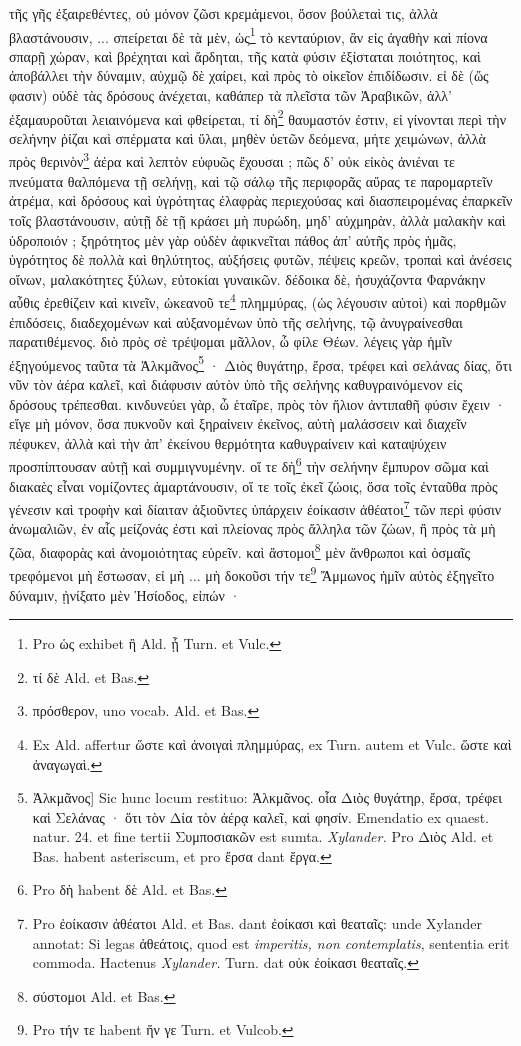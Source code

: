 \documentclass[a4paper, 11pt, oneside, polutonikogreek, german]{article}
\begin{document}
τῆς γῆς ἐξαιρεθέντες, οὐ μόνον ζῶσι κρεμάμενοι, ὅσον βούλεταὶ τις, ἀλλὰ βλαστάνουσιν, ... σπείρεται δὲ τὰ μὲν, ὡς\footnote{Pro ὡς exhibet ἢ Ald. ᾗ Turn. et Vulc.} τὸ κενταύριον, ἂν εἰς ἀγαθὴν καὶ πίονα σπαρῇ χώραν, καὶ βρέχηται καὶ ἄρδηται, τῆς κατὰ φύσιν ἐξίσταται ποιότητος, καὶ ἀποβάλλει τὴν δύναμιν, αὐχμῷ δὲ χαίρει, καὶ πρὸς τὸ οἰκεῖον ἐπιδίδωσιν. εἰ δὲ (ὥς φασιν) οὐδὲ τὰς δρόσους ἀνέχεται, καθάπερ τὰ πλεῖστα τῶν Ἀραβικῶν, ἀλλ' ἐξαμαυροῦται λειαινόμενα καὶ φθείρεται, τί δὴ\footnote{τί δὲ Ald. et Bas.} θαυμαστόν ἐστιν, εἰ γίνονται περὶ τὴν σελήνην ῥίζαι καὶ σπέρματα καὶ ὕλαι, μηθὲν ὑετῶν δεόμενα, μήτε χειμώνων, ἀλλὰ πρὸς θερινὸν\footnote{πρόσθερον, uno vocab. Ald. et Bas.} ἀέρα καὶ λεπτὸν εὐφυῶς ἔχουσαι ; πῶς δ' οὐκ εἰκὸς ἀνιέναι τε πνεύματα θαλπόμενα τῇ σελήνῃ, καὶ τῷ σάλῳ τῆς περιφορᾶς αὔρας τε παρομαρτεῖν ἀτρέμα, καὶ δρόσους καὶ ὑγρότητας ἐλαφρὰς περιεχούσας καὶ διασπειρομένας ἐπαρκεῖν τοῖς βλαστάνουσιν, αὐτῇ δὲ τῇ κράσει μὴ πυρώδη, μηδ' αὐχμηρὰν, ἀλλὰ μαλακὴν καὶ ὑδροποιόν ; ξηρότητος μὲν γὰρ οὐδὲν ἀφικνεῖται πάθος ἀπ' αὐτῆς πρὸς ἡμᾶς, ὑγρότητος δὲ πολλὰ καὶ θηλύτητος, αὐξήσεις φυτῶν, πέψεις κρεῶν, τροπαὶ καὶ ἀνέσεις οἴνων, μαλακότητες ξύλων, εὐτοκίαι γυναικῶν. δέδοικα δὲ, ἡσυχάζοντα Φαρνάκην αὖθις ἐρεθίζειν καὶ κινεῖν, ὠκεανοῦ τε\footnote{Ex Ald. affertur ὥστε καὶ ἀνοιγαὶ πλημμύρας, ex Turn. autem et Vulc. ὥστε καὶ ἀναγωγαὶ.} πλημμύρας, (ὡς λέγουσιν αὐτοὶ) καὶ πορθμῶν ἐπιδόσεις, διαδεχομένων καὶ αὐξανομένων ὑπὸ τῆς σελήνης, τῷ ἀνυγραίνεσθαι παρατιθέμενος. διὸ πρὸς σὲ τρέψομαι μᾶλλον, ὦ φίλε Θέων. λέγεις γὰρ ἡμῖν ἐξηγούμενος ταῦτα τὰ Ἀλκμᾶνος\footnote{Ἀλκμᾶνος] Sic hunc locum restituo: Ἀλκμᾶνος. οἷα Διὸς θυγάτηρ, ἔρσα, τρέφει καὶ Σελάνας · ὅτι τὸν Δία τὸν ἀέρᾳ καλεῖ, καὶ φησίν. Emendatio ex quaest. natur. 24. et fine tertii Συμποσιακῶν est sumta. \emph{Xylander.} Pro Διὸς Ald. et Bas. habent asteriscum, et pro ἔρσα dant ἔργα.} · Διὸς θυγάτηρ, ἔρσα, τρέφει καὶ σελάνας δίας, ὅτι νῦν τὸν ἀέρα καλεῖ, καὶ διάφυσιν αὐτὸν ὑπὸ τῆς σελήνης καθυγραινόμενον εἰς δρόσους τρέπεσθαι. κινδυνεύει γὰρ, ὦ ἑταῖρε, πρὸς τὸν ἥλιον ἀντιπαθῆ φύσιν ἔχειν · εἴγε μὴ μόνον, ὅσα πυκνοῦν καὶ ξηραίνειν ἐκεῖνος, αὐτὴ μαλάσσειν καὶ διαχεῖν πέφυκεν, ἀλλὰ καὶ τὴν ἀπ' ἐκείνου θερμότητα καθυγραίνειν καὶ καταψύχειν προσπίπτουσαν αὐτῇ καὶ συμμιγνυμένην. οἵ τε δὴ\footnote{Pro δὴ habent δὲ Ald. et Bas.} τὴν σελήνην ἔμπυρον σῶμα καὶ διακαὲς εἶναι νομίζοντες ἁμαρτάνουσιν, οἵ τε τοῖς ἐκεῖ ζώοις, ὅσα τοῖς ἐνταῦθα πρὸς γένεσιν καὶ τροφὴν καὶ δίαιταν ἀξιοῦντες ὑπάρχειν ἐοίκασιν ἀθέατοι\footnote{Pro ἐοίκασιν ἀθέατοι Ald. et Bas. dant ἐοίκασι καὶ θεαταῖς: unde Xylander annotat: Si legas ἀθεάτοις, quod est \emph{imperitis, non contemplatis}, sententia erit commoda. Hactenus \emph{Xylander.} Turn. dat οὐκ ἐοίκασι θεαταῖς.} τῶν περὶ φύσιν ἀνωμαλιῶν, ἐν αἷς μείζονάς ἐστι καὶ πλείονας πρὸς ἄλληλα τῶν ζώων, ἢ πρὸς τὰ μὴ ζῶα, διαφορὰς καὶ ἀνομοιότητας εὑρεῖν. καὶ ἄστομοι\footnote{σύστομοι Ald. et Bas.} μὲν ἄνθρωποι καὶ ὀσμαῖς τρεφόμενοι μὴ ἔστωσαν, εἰ μὴ ... μὴ δοκοῦσι τήν τε\footnote{Pro τήν τε habent ἥν γε Turn. et Vulcob.} Ἄμμωνος ἡμῖν αὐτὸς ἐξηγεῖτο δύναμιν, ᾐνίξατο μὲν Ἡσίοδος, εἰπών ·
\end{document}
